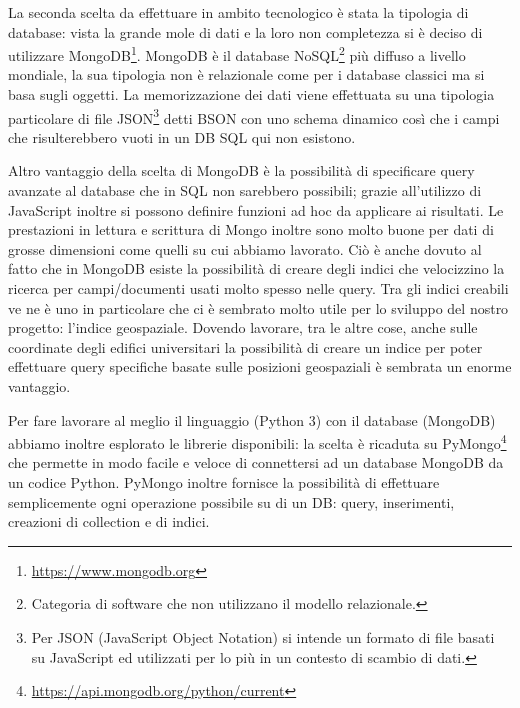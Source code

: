 \documentclass[12pt]{report}
\begin{document}
\vspace{5mm} %

La seconda scelta da effettuare in ambito tecnologico è stata la tipologia di database: vista la grande mole di dati e la loro non completezza si è deciso di utilizzare MongoDB\footnote{\url{https://www.mongodb.org}}. MongoDB è il database NoSQL\footnote{Categoria di software che non utilizzano il modello relazionale.} più diffuso a livello mondiale, la sua tipologia non è relazionale come per i database classici ma si basa sugli oggetti. La memorizzazione dei dati viene effettuata su una tipologia particolare di file JSON\footnote{Per JSON (JavaScript Object Notation) si intende un formato di file basati su JavaScript ed utilizzati per lo più in un contesto di scambio di dati.} detti BSON con uno schema dinamico così che i campi che risulterebbero vuoti in un DB SQL qui non esistono. 

Altro vantaggio della scelta di MongoDB è la possibilità di specificare query avanzate al database che in SQL non sarebbero possibili; grazie all'utilizzo di JavaScript inoltre si possono definire funzioni ad hoc da applicare ai risultati. Le prestazioni in lettura e scrittura di Mongo inoltre sono molto buone per dati di grosse dimensioni come quelli su cui abbiamo lavorato. Ciò è anche dovuto al fatto che in MongoDB esiste la possibilità di creare degli indici che velocizzino la ricerca per campi/documenti usati molto spesso nelle query. Tra gli indici creabili ve ne è uno in particolare che ci è sembrato molto utile per lo sviluppo del nostro progetto: l'indice geospaziale. Dovendo lavorare, tra le altre cose, anche sulle coordinate degli edifici universitari la possibilità di creare un indice per poter effettuare query specifiche basate sulle posizioni geospaziali è sembrata un enorme vantaggio.

Per fare lavorare al meglio il linguaggio (Python 3) con il database (MongoDB) abbiamo inoltre esplorato le librerie disponibili: la scelta è ricaduta su PyMongo\footnote{\url{https://api.mongodb.org/python/current}} che permette in modo facile e veloce di connettersi ad un database MongoDB da un codice Python. PyMongo inoltre fornisce la possibilità di effettuare semplicemente ogni operazione possibile su di un DB: query, inserimenti, creazioni di collection e di indici. 

\vspace{5mm} %
 
\end{document}
